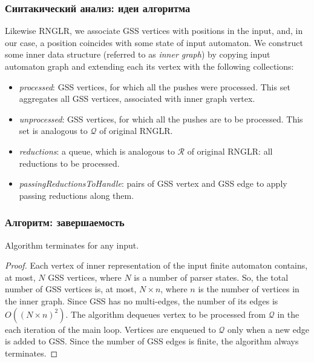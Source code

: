\documentclass{beamer}
\begin{document}
\begin{frame}
    \transwipe[direction=90]
    \frametitle{Синтакический анализ: идеи алгоритма}

Likewise RNGLR, we associate GSS vertices with positions in the input,
and, in our case, a position coincides with some state of input automaton. We construct some
inner data structure (referred to as \emph{inner graph}) by copying input automaton graph and 
extending each its vertex with the following collections: 

\begin{itemize}
  \item \emph{processed}: GSS vertices, for which all the pushes were processed. 
   This set aggregates all GSS vertices, associated with inner graph vertex.
  \item \emph{unprocessed}: GSS vertices, for which all the pushes are to be processed. 
   This set is analogous to $\mathcal{Q}$ of original RNGLR.
  \item \emph{reductions}: a queue, which is analogous to $\mathcal{R}$ of original RNGLR: 
   all reductions to be processed.
  \item \emph{passingReductionsToHandle}: pairs of GSS vertex and GSS edge to apply 
   passing reductions along them.
\end{itemize}
\end{frame}

\begin{frame}
    \transwipe[direction=90]
    \frametitle{Алгоритм: завершаемость}
    \begin{theorem}
             Algorithm terminates for any input.
    \end{theorem}

    \begin{proof}
       Each vertex of inner representation of the input finite automaton contains, at most, $N$ GSS vertices, where $N$ is a number of parser states. So, the total number of 
       GSS vertices is, at most, $N\times n$, where $n$ is the number of vertices in the inner graph. 
       Since GSS has no multi-edges, the number of its edges is $O((N\times n)^2)$. The algorithm 
       dequeues vertex to be processed from $\mathcal Q$ in the each iteration of the 
       main loop. Vertices are enqueued to $\mathcal Q$ only when a new edge is added to GSS. Since the number of GSS edges is finite, the algorithm always terminates.
    \end{proof}

\end{frame}
\end{document}
